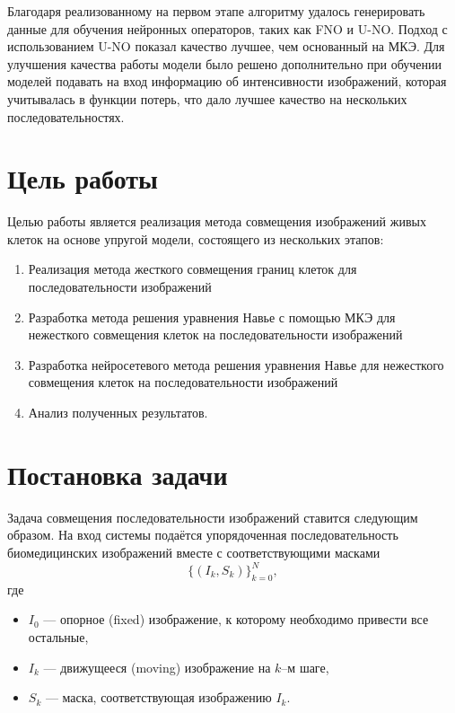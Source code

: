 \documentclass[12pt]{article}
\begin{document}
Благодаря реализованному на первом этапе алгоритму удалось генерировать данные для обучения нейронных операторов, таких как FNO и U-NO. Подход с использованием U-NO показал качество лучшее, чем основанный на  МКЭ. Для улучшения качества работы модели было решено дополнительно при обучении моделей подавать на вход информацию об интенсивности изображений, которая учитывалась в функции потерь, что дало лучшее качество на нескольких последовательностях.





\section{Цель работы}

Целью работы является реализация метода совмещения изображений живых клеток на основе упругой модели, состоящего из нескольких этапов:

\begin{enumerate}
 \item Реализация метода жесткого совмещения границ клеток для последовательности изображений
 \item Разработка метода решения уравнения Навье с помощью МКЭ для нежесткого совмещения клеток на последовательности изображений
 \item Разработка нейросетевого метода решения уравнения Навье для нежесткого совмещения клеток на последовательности изображений
 \item Анализ полученных результатов.
\end{enumerate}

\section{Постановка задачи}

Задача совмещения последовательности изображений ставится следующим образом. На вход системы подаётся упорядоченная последовательность биомедицинских изображений вместе с соответствующими масками
\[
\{(I_k, S_k)\}_{k=0}^N,
\]
где
\begin{itemize}
  \item $I_0$ — опорное (fixed) изображение, к которому необходимо привести все остальные,
  \item $I_k$ — движущееся (moving) изображение на $k$–м шаге,
  \item $S_k$ — маска, соответствующая изображению $I_k$.
\end{itemize}
\end{document}
